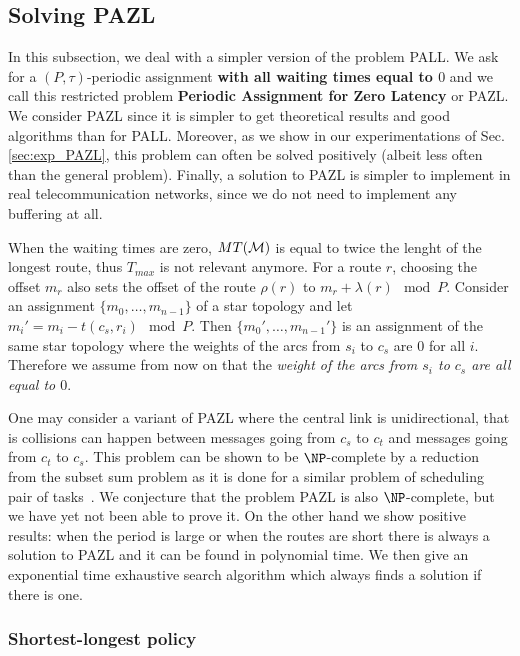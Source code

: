 \documentclass[a4paper,10pt]{article}
\begin{document}
{      

  \subsection{Solving PAZL}
  
  In this subsection, we deal with a simpler version of the problem PALL.
  We ask for a $(P,\tau)$-periodic assignment {\bf with all waiting times equal to $0$} and we call this restricted problem {\bf Periodic Assignment for Zero Latency} or PAZL. We consider PAZL since it is simpler to get theoretical results and good algorithms 
  than for PALL. Moreover, as we show in our experimentations of Sec.\ref{sec:exp_PAZL}, this problem can often be solved positively (albeit less often than the general problem). Finally, a solution to PAZL is simpler to implement in real telecommunication networks, since we do not need to implement any buffering at all.    
  
  When the waiting times are zero, $MT({\cal M})$ is equal to twice the lenght of the longest route, thus $T_{max}$ is not relevant anymore. For a route $r$, choosing the offset $m_r$ also sets the offset of the route $\rho(r)$ to $m_{r} + \lambda(r) \mod P$.
  Consider an assignment $\{m_0,\dots,m_{n-1}\}$ of a star topology and let $m_i'= m_{i} - t(c_s,r_i) \mod P$.
  Then $\{m_0',\dots,m_{n-1}'\}$ is an assignment of the same star topology where the weights of the arcs from $s_i$ to $c_s$ are $0$
  for all $i$. Therefore we assume from now on that the \emph{weight of the arcs from $s_i$ to $c_s$ are all equal to $0$}.
  
  
  One may consider a variant of PAZL where the central link is unidirectional, that is collisions can happen between messages going from $c_s$ to $c_t$ and messages  going from $c_t$ to $c_s$. This problem can be shown to be $\NP$-complete by a reduction from the subset sum problem as it is done for a similar problem of scheduling pair of tasks~\cite{orman1997complexity}. We conjecture that the problem PAZL is also $\NP$-complete,  but we have yet not been able to prove it.
  On the other hand we show positive results:  when the period is large or when the routes are short there is always a solution to PAZL and it can be found in polynomial time. We then give an exponential time exhaustive search algorithm which always finds a solution if there is one. 
  
    \subsubsection*{Shortest-longest policy}
    

}
\end{document}
